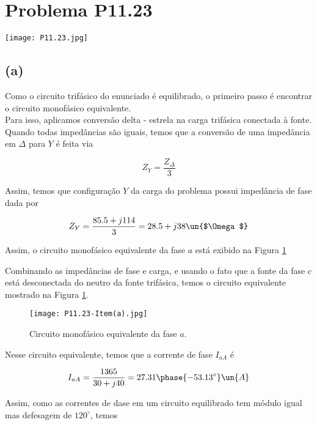 
\section*{Problema P11.23}

\renewcommand*\thesection{11.23}

\begin{center}
    \texttt{[image: P11.23.jpg]}
\end{center}

\subsection*{(a)}

Como o circuito trifásico do enunciado é equilibrado, o primeiro passo é encontrar o circuito monofásico equivalente. \\
Para isso, aplicamos conversão delta - estrela na carga trifásica conectada à fonte. Quando todas impedâncias são iguais,
temos que a conversão de uma impedância em $\Delta$ para $Y$ é feita via

\begin{equation}\label{eq:11.23.1}
    Z_{Y} = \frac{Z_{\Delta}}{3}
\end{equation}

Assim, temos que configuração $Y$ da carga do problema possui impedância de fase dada por   

\[ Z_Y = \frac{85.5 + j114}{3} = 28.5 +j38 \un{$\Omega$} \]

Assim, o circuito monofásico equivalente da fase $a$ está exibido na Figura \ref*{fig:11.23.1}

Combinando as impedâncias de fase e carga, e usando o fato que a fonte da fase $c$ está desconectada do neutro da fonte trifásica, 
temos o circuito equivalente mostrado na Figura \ref*{fig:11.23.1}.

\begin{figure}[hb]
    \centering
    \caption{Circuito monofásico equivalente da fase $a$.}
      \centering
      \texttt{[image: P11.23-Item(a).jpg]} \\
    \label{fig:11.23.1}
\end{figure}

Nesse circuito equivalente, temos que a corrente de fase $I_{aA}$ é   

\[ I_{aA} = \frac{1365}{30 + j40} = 27.31\phase{-53.13^{\circ}} \un{A} \]

Assim, como as correntes de dase em um circuito equilibrado tem módulo igual mas defesagem de $120^{\circ}$, temos  

